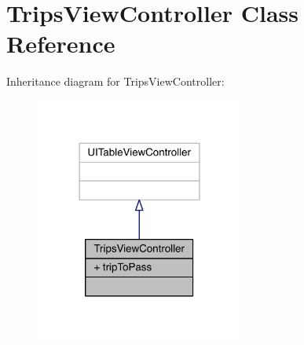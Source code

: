 \hypertarget{interface_trips_view_controller}{\section{Trips\-View\-Controller Class Reference}
\label{interface_trips_view_controller}
}


Inheritance diagram for Trips\-View\-Controller\-:\nopagebreak
\begin{figure}[H]
\begin{center}
\leavevmode
\includegraphics[width=194pt]{interface_trips_view_controller__inherit__graph}
\end{center}
\end{figure}


